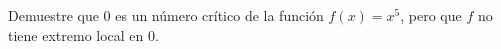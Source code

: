 \item Demuestre que $0$ es un número crítico de la función $f(x) = x^5$, pero que $f$ no tiene extremo local en $0$.
